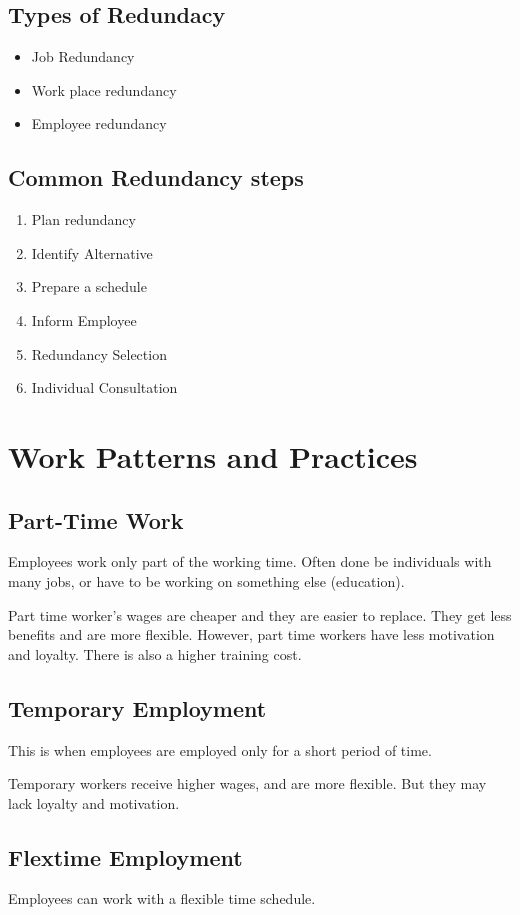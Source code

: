 \documentclass{standalone}
\begin{document}
\subsection{Types of Redundacy}
\begin{itemize}
	\item Job Redundancy
	\item Work place redundancy
	\item Employee redundancy
\end{itemize}

\subsection{Common Redundancy steps}
\begin{enumerate}
	\item Plan redundancy
	\item Identify Alternative
	\item Prepare a schedule
	\item Inform Employee
	\item Redundancy Selection
	\item Individual Consultation
\end{enumerate}

\section{Work Patterns and Practices}
\subsection{Part-Time Work}
Employees work only part of the working time.
Often done be individuals with many jobs, or have to be working on something else (education).

Part time worker's wages are cheaper and they are easier to replace.
They get less benefits and are more flexible.
However, part time workers have less motivation and loyalty.
There is also a higher training cost.

\subsection{Temporary Employment}
This is when employees are employed only for a short period of time.

Temporary workers receive higher wages, and are more flexible.
But they may lack loyalty and motivation.

\subsection{Flextime Employment}
Employees can work with a flexible time schedule.
\end{document}
